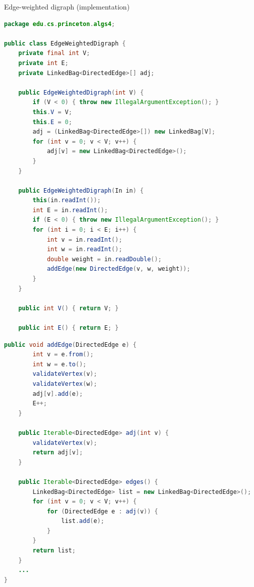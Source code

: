 \documentclass[8pt,a4paper,compress]{beamer}
\begin{document}
\begin{frame}[fragile]
Edge-weighted digraph (implementation)
\begin{lstlisting}[language=Java]
package edu.cs.princeton.algs4;

public class EdgeWeightedDigraph {
    private final int V;
    private int E;
    private LinkedBag<DirectedEdge>[] adj;
    
    public EdgeWeightedDigraph(int V) {
        if (V < 0) { throw new IllegalArgumentException(); }
        this.V = V;
        this.E = 0;
        adj = (LinkedBag<DirectedEdge>[]) new LinkedBag[V];
        for (int v = 0; v < V; v++) {
            adj[v] = new LinkedBag<DirectedEdge>();
        }
    }

    public EdgeWeightedDigraph(In in) {
        this(in.readInt());
        int E = in.readInt();
        if (E < 0) { throw new IllegalArgumentException(); }
        for (int i = 0; i < E; i++) {
            int v = in.readInt();
            int w = in.readInt();
            double weight = in.readDouble();
            addEdge(new DirectedEdge(v, w, weight));
        }
    }
    
    public int V() { return V; }

    public int E() { return E; }
\end{lstlisting}
\end{frame}

\begin{frame}[fragile]
\begin{lstlisting}[language=Java]
    public void addEdge(DirectedEdge e) {
        int v = e.from();
        int w = e.to();
        validateVertex(v);
        validateVertex(w);
        adj[v].add(e);
        E++;
    }

    public Iterable<DirectedEdge> adj(int v) {
        validateVertex(v);
        return adj[v];
    }

    public Iterable<DirectedEdge> edges() {
        LinkedBag<DirectedEdge> list = new LinkedBag<DirectedEdge>();
        for (int v = 0; v < V; v++) {
            for (DirectedEdge e : adj(v)) {
                list.add(e);
            }
        }
        return list;
    } 
    ...
}
\end{lstlisting}
\end{frame}
\end{document}
